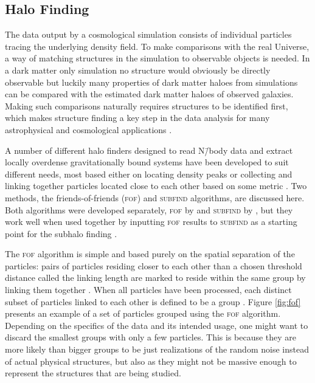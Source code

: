 \documentclass[english, oneside]{HYgradu}
\begin{document}
\subsection{Halo Finding} \label{sect:halofinding}
The data output by a cosmological simulation consists of individual particles tracing the underlying density field. To make comparisons with the real Universe, a way of matching structures in the simulation to observable objects is needed. In a dark matter only simulation no structure would obviously be directly observable but luckily many properties of dark matter haloes from simulations can be compared with the estimated dark matter haloes of observed galaxies. Making such comparisons naturally requires structures to be identified first, which makes structure finding a key step in the data analysis for many astrophysical and cosmological applications \citep{knebe2013structure}.

A number of different halo finders designed to read N\=/body data and extract locally overdense gravitationally bound systems have been developed to suit different needs, most based either on locating density peaks or collecting and linking together particles located close to each other based on some metric \citep{knebe2013structure}. Two methods, the friends-of-friends (\textsc{fof}) and \textsc{subfind} algorithms, are discussed here. Both algorithms were developed separately, \textsc{fof} by \citet{davis1985evolution} and \textsc{subfind} by \citet{springel2001populating}, but they work well when used together by inputting \textsc{fof} results to \textsc{subfind} as a starting point for the subhalo finding \citep{springel2005cosmological}.

The \textsc{fof} algorithm is simple and based purely on the spatial separation of the particles: pairs of particles residing closer to each other than a chosen threshold distance called the linking length are marked to reside within the same group by linking them together \citep{davis1985evolution}. When all particles have been processed, each distinct subset of particles linked to each other is defined to be a group \citep{davis1985evolution}. Figure \ref{fig:fof} presents an example of a set of particles grouped using the \textsc{fof} algorithm. Depending on the specifics of the data and its intended usage, one might want to discard the smallest groups with only a few particles. This is because they are more likely than bigger groups to be just realizations of the random noise instead of actual physical structures, but also as they might not be massive enough to represent the structures that are being studied.
\end{document}
